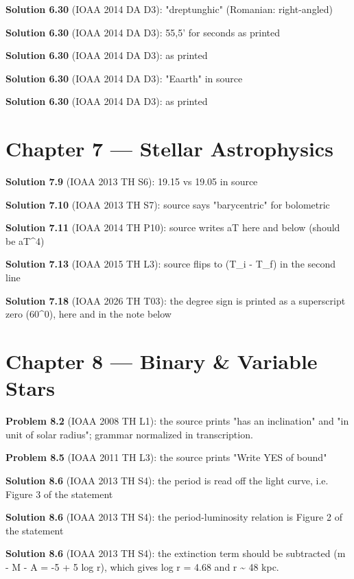 \noindent\textbf{Solution 6.30} (IOAA 2014 DA D3): "dreptunghic" (Romanian: right-angled)
\smallskip

\noindent\textbf{Solution 6.30} (IOAA 2014 DA D3): 55,5' for seconds as printed
\smallskip

\noindent\textbf{Solution 6.30} (IOAA 2014 DA D3): as printed
\smallskip

\noindent\textbf{Solution 6.30} (IOAA 2014 DA D3): "Eaarth" in source
\smallskip

\noindent\textbf{Solution 6.30} (IOAA 2014 DA D3): as printed
\smallskip

\section*{Chapter 7 --- Stellar Astrophysics}

\noindent\textbf{Solution 7.9} (IOAA 2013 TH S6): 19.15 vs 19.05 in source
\smallskip

\noindent\textbf{Solution 7.10} (IOAA 2013 TH S7): source says "barycentric" for bolometric
\smallskip

\noindent\textbf{Solution 7.11} (IOAA 2014 TH P10): source writes aT here and below (should be aT\^{}4)
\smallskip

\noindent\textbf{Solution 7.13} (IOAA 2015 TH L3): source flips to (T\_i - T\_f) in the second line
\smallskip

\noindent\textbf{Solution 7.18} (IOAA 2026 TH T03): the degree sign is printed as a superscript zero (60\^{}0), here and in the note below
\smallskip

\section*{Chapter 8 --- Binary \& Variable Stars}

\noindent\textbf{Problem 8.2} (IOAA 2008 TH L1): the source prints "has an inclination" and "in unit of solar radius"; grammar normalized in transcription.
\smallskip

\noindent\textbf{Problem 8.5} (IOAA 2011 TH L3): the source prints "Write YES of bound"
\smallskip

\noindent\textbf{Solution 8.6} (IOAA 2013 TH S4): the period is read off the light curve, i.e. Figure 3 of the statement
\smallskip

\noindent\textbf{Solution 8.6} (IOAA 2013 TH S4): the period-luminosity relation is Figure 2 of the statement
\smallskip

\noindent\textbf{Solution 8.6} (IOAA 2013 TH S4): the extinction term should be subtracted (m - M - A = -5 + 5 log r), which gives log r = 4.68 and r \textasciitilde{} 48 kpc.
\smallskip

